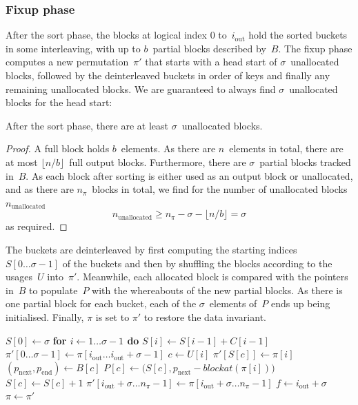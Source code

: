 \documentclass[nolineno,a4paper,UKenglish,cleveref, autoref, thm-restate]{socg-lipics-v2021}
\def\blockat{\textit{blockat}}
\begin{document}
\subsubsection{Fixup phase}
After the sort phase, the blocks at logical index $0$ to~$i_{\mathrm{out}}$ hold the
sorted buckets in some interleaving, with up to $b$~partial blocks described by~$B$.
The fixup phase computes a new permutation~$\pi'$ that starts with
a head start of $\sigma$~unallocated blocks, followed by the deinterleaved buckets in order
of keys and finally any remaining unallocated blocks.
We are guaranteed to always find $\sigma$~unallocated blocks for the head start:

\begin{lemma}
After the sort phase, there are at least $\sigma$~unallocated blocks.
\end{lemma}
\begin{proof}
A full block holds $b$~elements.  As there are $n$~elements in total, there are at most
$\lfloor n/b\rfloor$~full output blocks.  Furthermore, there are $\sigma$~partial blocks
tracked in~$B$.  As each block after sorting is either used as an output block or unallocated,
and as there are $n_\pi$~blocks in total, we find for the number of unallocated blocks~$n_{\mathrm{unallocated}}$
\begin{equation}
n_{\mathrm{unallocated}}\ge n_\pi-\sigma-\lfloor n/b\rfloor=\sigma
\end{equation}
as required.
\end{proof}

\noindent
The buckets are deinterleaved by first computing the starting
indices~$S[0\ldots\sigma-1]$ of the buckets and then by shuffling the blocks according
to the usages~$U$ into~$\pi'$.  Meanwhile, each allocated block is compared with the
pointers in~$B$ to populate~$P$ with the whereabouts of the new partial blocks.  As there is
one partial block for each bucket, each of the $\sigma$~elements of~$P$ ends up being initialised.
Finally, $\pi$ is set to $\pi'$ to restore the data invariant.

\begin{algorithm}
\caption{fixup phase}\label{alg:fixupphase}
\begin{algorithmic}[1]
\State$S[0]\gets\sigma$
\State\textbf{for $i\gets 1\ldots\sigma-1$ do} $S[i]\gets S[i-1]+C[i-1]$
\State$\pi'[0\ldots\sigma-1]\gets\pi[i_{\mathrm{out}}\ldots i_{\mathrm{out}}+\sigma-1]$
 \State$c\gets U[i]$
 \State$\pi'[S[c]]\gets\pi[i]$
 \State$(p_{\mathrm{next}},p_{\mathrm{end}})\gets B[c]$
 \If{$p_{\mathrm{end}}=\blockat(\pi[i])+b$} \label{stmt:ispartialblock}
  \State$P[c]\gets\bigl(S[c],p_{\mathrm{next}}-\blockat(\pi[i])\bigr)$
 \EndIf
 \State$S[c]\gets S[c]+1$
\EndFor
\State$\pi'[i_{\mathrm{out}}+\sigma\ldots n_\pi-1]\gets\pi[i_{\mathrm{out}}+\sigma\ldots n_\pi-1]$
\State$f\gets i_{\mathrm{out}}+\sigma$
\State$\pi\gets\pi'$
\EndProcedure
\end{algorithmic}
\end{algorithm}
\end{document}
